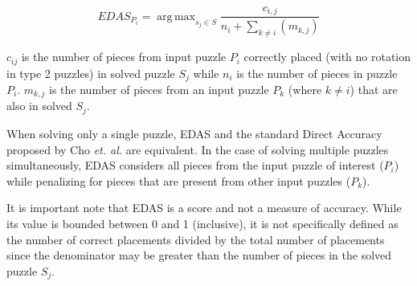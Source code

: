 \documentclass{report}
\DeclareMathOperator*{\argmax}{arg\,max} %
\begin{document}
\begin{equation} \label{eq:enhancedDirectAccuracyScore}
EDAS_{P_i} = \argmax_{s_j \in S}\frac{c_{i,j}}{n_i + \sum_{k \ne i}(m_{k,j})}
\end{equation}

$c_{ij}$ is the number of pieces from input puzzle $P_i$ correctly placed (with no rotation in type 2 puzzles) in solved puzzle $S_j$ while $n_i$ is the number of pieces in puzzle $P_i$. $m_{k,j}$ is the number of pieces from an input puzzle $P_k$ (where $k \ne i$) that are also in solved $S_j$.

When solving only a single puzzle, EDAS and the standard Direct Accuracy proposed by Cho \textit{et. al.} are equivalent.  In the case of solving multiple puzzles simultaneously, EDAS considers all pieces from the input puzzle of interest ($P_i$) while penalizing for pieces that are present from other input puzzles ($P_k$). 

It is important note that EDAS is a score and not a measure of accuracy. While its value is bounded between 0 and 1 (inclusive), it is not specifically defined as the number of correct placements divided by the total number of placements since the denominator may be greater than the number of pieces in the solved puzzle $S_j$.

\pagebreak


\end{document}
